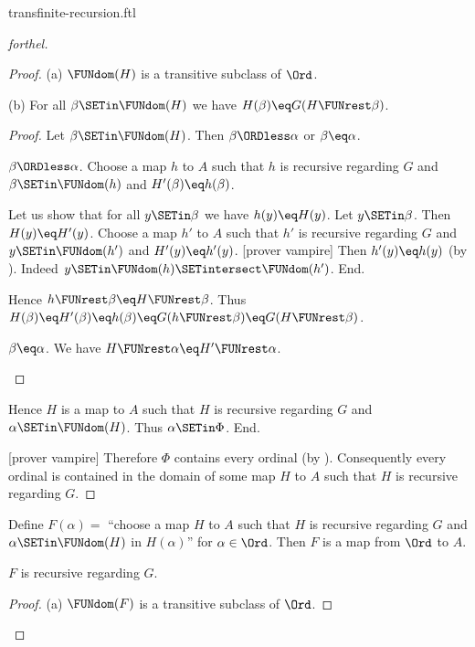\documentclass{stex}
\begin{document}
\begin{smodule}{transfinite-recursion.ftl}
\begin{proof}[forthel]
\begin{proof}
      (a) $\FUNdom(H)$ is a transitive subclass of $\Ord$.

      (b) For all $\beta \SETin \FUNdom(H)$ we have $H(\beta) \eq G(H \FUNrest \beta)$.
      \begin{proof}
        Let $\beta \SETin \FUNdom(H)$.
        Then $\beta \ORDless \alpha$ or $\beta \eq \alpha$.

        \begin{case}{$\beta \ORDless \alpha$.}
          Choose a map $h$ to $A$ such that $h$ is recursive regarding $G$ and $\beta \SETin \FUNdom(h)$ and $H'(\beta) \eq h(\beta)$.

          Let us show that for all $y \SETin \beta$ we have $h(y) \eq H(y)$.
            Let $y \SETin \beta$.
            Then $H(y) \eq H'(y)$.
            Choose a map $h'$ to $A$ such that $h'$ is recursive regarding $G$ and $y \SETin \FUNdom(h')$ and $H'(y) \eq h'(y)$.
            [prover vampire]
            Then $h'(y) \eq h(y)$ (by ).
            Indeed $y \SETin \FUNdom(h) \SETintersect \FUNdom(h')$.
          End.

          Hence $h \FUNrest \beta \eq H \FUNrest \beta$.
          Thus $H(\beta)
            \eq H'(\beta)
            \eq h(\beta)
            \eq G(h \FUNrest \beta)
            \eq G(H \FUNrest \beta)$.
        \end{case}

        \begin{case}{$\beta \eq \alpha$.}
          We have $H \FUNrest \alpha \eq H' \FUNrest \alpha$.
        \end{case}
      \end{proof}

      Hence $H$ is a map to $A$ such that $H$ is recursive regarding $G$ and $\alpha \SETin \FUNdom(H)$.
      Thus $\alpha \SETin \Phi$.
    End.

    [prover vampire]
    Therefore $\Phi$ contains every ordinal (by ).
    Consequently every ordinal is contained in the domain of some map $H$ to $A$ such that $H$ is recursive regarding $G$.
  \end{proof}

  Define $F(\alpha) =$ ``choose a map $H$ to $A$ such that $H$ is recursive regarding $G$ and $\alpha \SETin \FUNdom(H)$ in $H(\alpha)$'' for $\alpha \in \Ord$.
  Then $F$ is a map from $\Ord$ to $A$.

  $F$ is recursive regarding $G$.
  \begin{proof}
    (a) $\FUNdom(F)$ is a transitive subclass of $\Ord$.


\end{proof}
\end{proof}
\end{smodule}
\end{document}
